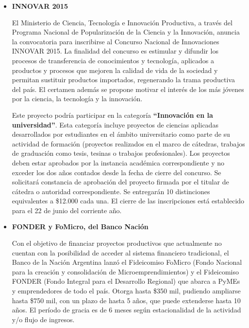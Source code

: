     \begin{itemize}
    
    \item \textbf{INNOVAR 2015}
    
    El Ministerio de Ciencia, Tecnología e Innovación Productiva, a través del Programa Nacional de Popularización de la Ciencia y la Innovación, anuncia la convocatoria para inscribirse al Concurso Nacional de Innovaciones INNOVAR 2015. La finalidad del concurso es estimular y difundir los procesos de transferencia de conocimientos y tecnología, aplicados a productos y procesos que mejoren la calidad de vida de la sociedad y permitan sustituir productos importados, regenerando la trama productiva del país. El certamen además se propone motivar el interés de los más jóvenes por la ciencia, la tecnología y la innovación.
    
    Este proyecto podría participar en la categoría \textbf{``Innovación en la universidad''}.
    Esta categoría incluye proyectos de ciencias aplicadas desarrollados por estudiantes en el ámbito universitario como parte de su actividad de formación (proyectos realizados en el marco de cátedras, trabajos de graduación como tesis, tesinas o trabajos profesionales). Los proyectos deben estar aprobados por la instancia académica correspondiente y no exceder los dos años contados desde la fecha de cierre del concurso.  Se solicitará constancia de aprobación del proyecto firmada por el titular de cátedra o autoridad correspondiente. Se entregarán 10 distinciones equivalentes a \$12.000 cada una. El cierre de las inscripciones está establecido para el 22 de junio del corriente año.
    
    
    \item \textbf{FONDER y FoMicro, del Banco Nación}
    
    Con el objetivo de financiar proyectos productivos que actualmente no cuentan con la posibilidad de acceder al sistema financiero tradicional, el Banco de la Nación Argentina lanzó el Fideicomiso FoMicro (Fondo Nacional para la creación y consolidación de Microemprendimientos) y el Fideicomiso FONDER (Fondo Integral para el Desarrollo Regional) que abarca a PyMEs y emprendedores de todo el país. Otorga hasta \$350 mil, pudiendo ampliarse hasta \$750 mil, con un plazo de hasta 5 años, que puede extenderse hasta 10 años. El período de gracia es de 6 meses según estacionalidad de la actividad y/o flujo de ingresos.
    

\end{itemize}
